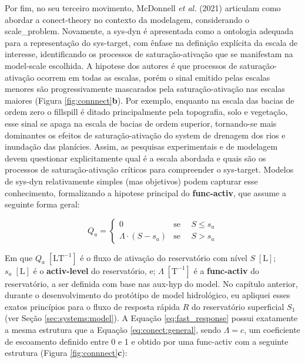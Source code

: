\documentclass[./main.tex]{subfiles}
\begin{document}
\par Por fim, no seu terceiro movimento, McDonnell \textit{et al.} (2021) articulam como abordar a \gls{conect-theory} no contexto da modelagem, considerando o \gls{scale_problem}. Novamente, a \gls{sys-dyn} é apresentada como a ontologia adequada para a representação do \gls{sys-target}, com ênfase na definição explícita da escala de interesse, identificando os processos de saturação-ativação que se manifestam na \gls{model-scale} escolhida. A \gls{hipotese} dos autores é que processos de saturação-ativação ocorrem em todas as escalas, porém o sinal emitido pelas escalas menores são progressivamente mascarados pela saturação-ativação nas escalas maiores (Figura \ref{fig:connnect}\textbf{b}). Por exemplo, enquanto na escala das bacias de ordem zero o \gls{fillspill} é ditado principalmente pela topografia, solo e vegetação, esse sinal se apaga na escala de bacias de ordem superior, tornando-se mais dominantes os efeitos de saturação-ativação do \gls{system} de drenagem dos rios e inundação das planícies. Assim, as pesquisas experimentais e de modelagem devem questionar explicitamente qual é a escala abordada e quais são os processos de saturação-ativação críticos para compreender o \gls{sys-target}. Modelos de \gls{sys-dyn} relativamente simples (mas objetivos) podem capturar esse conhecimento, formalizando a \gls{hipotese} principal do \textbf{\gls{func-activ}}, que assume a seguinte forma geral:
\begin{linenomath*}
\begin{equation}
\label{eq:conect:general}
Q_a = 
\begin{cases} 
    0 & \text{se } \quad S \leq s_a\\
    \Lambda \cdot (S - s_a) & \text{se } \quad S > s_a
\end{cases}
\end{equation}
\end{linenomath*}
Em que $Q_a\;[\text{L}\text{T}^{-1}]$ é o fluxo de ativação do reservatório com nível $S\;[\text{L}]$; $s_{a}\;[\text{L}]$ é o \textbf{\gls{activ-level}} do reservatório, e; $\Lambda \;[\text{T}^{-1}]$ é a \textbf{\gls{func-activ}} do reservatório, a ser definida com base nas \gls{aux-hyp} do \gls{model}. No capítulo anterior, durante o desenvolvimento do protótipo de \gls{model} hidrológico, eu apliquei esses exatos princípios para o fluxo de resposta rápida $R$ do reservatório superficial $S_1$ (ver Seção \ref{sec:systems:model}). A Equação \eqref{eq:fast_response} possui exatamente a mesma estrutura que a Equação \eqref{eq:conect:general}, sendo $\Lambda = c$, um coeficiente de escoamento definido entre 0 e 1 e obtido por uma \gls{func-activ} com a seguinte estrutura (Figura \ref{fig:connnect}\textbf{c}):
\end{document}
